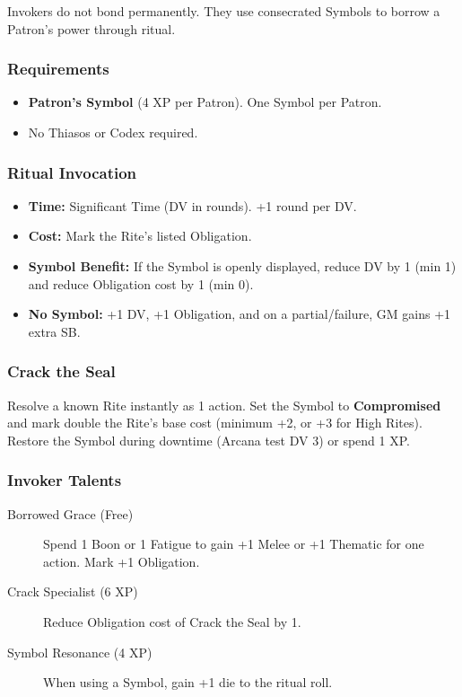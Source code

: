 Invokers do not bond permanently. They use consecrated Symbols to borrow a Patron's power through ritual.

\subsubsection*{Requirements}
\begin{itemize}
  \item \textbf{Patron's Symbol} (4 XP per Patron). One Symbol per Patron.
  \item No Thiasos or Codex required.
\end{itemize}

\subsubsection*{Ritual Invocation}
\label{sec:ritual-invocation}
\begin{itemize}
  \item \textbf{Time:} Significant Time (DV in rounds). +1 round per DV.
  \item \textbf{Cost:} Mark the Rite's listed Obligation.
  \item \textbf{Symbol Benefit:} If the Symbol is openly displayed, reduce DV by 1 (min 1) and reduce Obligation cost by 1 (min 0).
  \item \textbf{No Symbol:} +1 DV, +1 Obligation, and on a partial/failure, GM gains +1 extra SB.
\end{itemize}

\subsubsection*{Crack the Seal}
\label{sec:crack-the-seal}
Resolve a known Rite instantly as 1 action. Set the Symbol to \textbf{Compromised} and mark double the Rite's base cost (minimum +2, or +3 for High Rites). Restore the Symbol during downtime (Arcana test DV 3) or spend 1 XP.

\subsubsection*{Invoker Talents}
\label{sec:invoker-talents}
\begin{description}
  \item[Borrowed Grace (Free)] Spend 1 Boon or 1 Fatigue to gain +1 Melee or +1 Thematic for one action. Mark +1 Obligation.
  \item[Crack Specialist (6 XP)] Reduce Obligation cost of Crack the Seal by 1.
  \item[Symbol Resonance (4 XP)] When using a Symbol, gain +1 die to the ritual roll.
\end{description}

